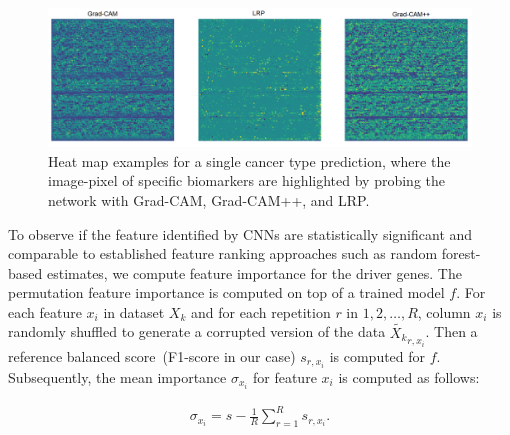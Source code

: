 \begin{figure}[h]
	\centering
	\includegraphics[scale=0.7]{images/3_mode.png}
	\caption[Heat map examples for a single cancer type prediction]{Heat map examples for a single cancer type prediction, where the image-pixel of specific biomarkers are highlighted by probing the network with Grad-CAM, Grad-CAM++, and LRP.} 
	\label{fig:3hms}
\end{figure}

\hspace*{3.5mm} To observe if the feature identified by CNNs are statistically significant and comparable to established feature ranking approaches such as random forest-based estimates, we compute feature importance for the driver genes. The permutation feature importance is computed on top of a trained model $f$. For each feature $x_i$ in dataset $X_k$ and for each repetition $r$ in $1, 2, \ldots, R$, column $x_i$ is randomly shuffled to generate a corrupted version of the data $\tilde{X_k}_{r,x_i}$. Then a reference balanced score~(F1-score in our case) $s_{r,x_i}$ is computed for $f$. Subsequently, the mean importance $\sigma_{x_i}$ for feature $x_{i}$ is computed as follows: 

\begin{align}
    \sigma_{x_i}=s-\frac{1}{R} \sum_{r=1}^{R} s_{r,x_i}.
\end{align}

